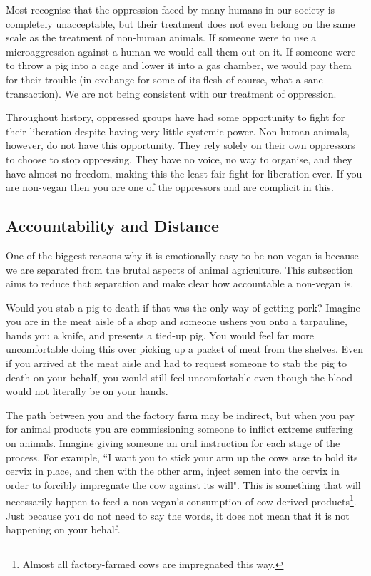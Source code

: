 Most recognise that the oppression faced by many humans in our society is completely unacceptable, but their treatment does not even belong on the same scale as the treatment of non-human animals. If someone were to use a microaggression against a human we would call them out on it. If someone were to throw a pig into a cage and lower it into a gas chamber, we would pay them for their trouble (in exchange for some of its flesh of course, what a sane transaction). We are not being consistent with our treatment of oppression. 

Throughout history, oppressed groups have had some opportunity to fight for their liberation despite having very little systemic power. Non-human animals, however, do not have this opportunity. They rely solely on their own oppressors to choose to stop oppressing. They have no voice, no way to organise, and they have almost no freedom, making this the least fair fight for liberation ever. If you are non-vegan then you are one of the oppressors and are complicit in this.

\subsection{Accountability and Distance}

One of the biggest reasons why it is emotionally easy to be non-vegan is because we are separated from the brutal aspects of animal agriculture. This subsection aims to reduce that separation and make clear how accountable a non-vegan is.

Would you stab a pig to death if that was the only way of getting pork? Imagine you are in the meat aisle of a shop and someone ushers you onto a tarpauline, hands you a knife, and presents a tied-up pig. You would feel far more uncomfortable doing this over picking up a packet of meat from the shelves. Even if you arrived at the meat aisle and had to request someone to stab the pig to death on your behalf, you would still feel uncomfortable even though the blood would not literally be on your hands.

The path between you and the factory farm may be indirect, but when you pay for animal products you are commissioning someone to inflict extreme suffering on animals. Imagine giving someone an oral instruction for each stage of the process. For example, ``I want you to stick your arm up the cows arse to hold its cervix in place, and then with the other arm, inject semen into the cervix in order to forcibly impregnate the cow against its will". This is something that will necessarily happen to feed a non-vegan's consumption of cow-derived products\footnote{Almost all factory-farmed cows are impregnated this way.}. Just because you do not need to say the words, it does not mean that it is not happening on your behalf.

